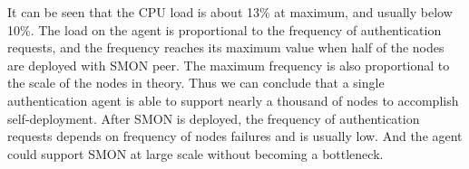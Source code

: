 It can be seen that the CPU load is about 13\% at maximum,
and usually below 10\%.  The load on the agent is
proportional to the frequency of authentication requests,
and the frequency reaches its maximum value when half of the
nodes are deployed with SMON peer. The maximum frequency is
also proportional to the scale of the nodes in theory. Thus
we can conclude that a single authentication agent is able
to support nearly a thousand of nodes to accomplish
self-deployment. After SMON is deployed, the frequency of
authentication requests depends on frequency of nodes
failures and is usually low.  And the agent could support
SMON at large scale without becoming a bottleneck.

